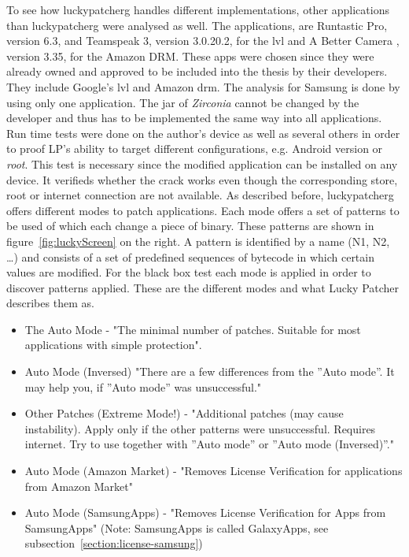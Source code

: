 \newline
To see how \gls{luckypatcherg} handles different implementations, other applications than \gls{luckypatcherg} were analysed as well.
The applications, are Runtastic Pro\cite{runtasticApp}, version 6.3, and Teamspeak 3\cite{teamspeakApp}, version 3.0.20.2, for the \gls{lvl} and A Better Camera \cite{abettercamera}, version 3.35, for the Amazon DRM.
These apps were chosen since they were already owned and approved to be included into the thesis by their developers.
They include Google’s \gls{lvl} and Amazon \gls{drm}.
The analysis for Samsung is done by using only one application.
The \gls{jar} of \textit{Zirconia} cannot be changed by the developer and thus has to be implemented the same way into all applications.
\newline
Run time tests were done on the author's device as well as several others in order to proof LP's ability to target different configurations, e.g. Android version or \textit{root}.
This test is necessary since the modified application can be installed on any device.
It verifieds whether the crack works even though the corresponding store, root or internet connection are not available.
\newline
As described before, \gls{luckypatcherg} offers different modes to patch applications.
Each mode offers a set of patterns to be used of which each change a piece of binary.
These patterns are shown in figure~\ref{fig:luckyScreen} on the right.
A pattern is identified by a name (N1, N2, …) and consists of a set of predefined sequences of bytecode in which certain values are modified.
For the black box test each mode is applied in order to discover patterns applied.
\newline
These are the different modes and what Lucky Patcher describes them as.
\begin{itemize}
\item The Auto Mode - "The minimal number of patches. Suitable for most applications with simple protection".
\item Auto Mode (Inversed) "There are a few differences from the ”Auto mode”. It may help you, if ”Auto mode” was unsuccessful."
\item Other Patches (Extreme Mode!) - "Additional patches (may cause instability). Apply only if the other patterns were unsuccessful. Requires internet. Try to use together with ”Auto mode” or ”Auto mode (Inversed)”."
\item Auto Mode (Amazon Market) - "Removes License Verification for applications from Amazon Market"
\item Auto Mode (SamsungApps) - "Removes License Verification for Apps from SamsungApps" (Note: SamsungApps is called GalaxyApps, see subsection~\ref{section:license-samsung})
\end{itemize}
